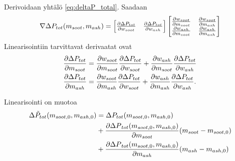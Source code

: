 





Derivoidaan yhtälö \eqref{eq:deltaP_total}. Saadaan
\begin{align}
    \nabla \Delta P_{tot}(m_{soot}, m_{ash})=
    \begin{bmatrix}   \frac{\partial \Delta P_{tot}}{\partial w_{soot}}
        &   \frac{\partial \Delta P_{tot}}{\partial w_{ash}}
         \end{bmatrix}
    \begin{bmatrix} 
        \frac{\partial w_{soot}}{\partial m_{soot}} & \frac{\partial w_{soot}}{\partial m_{ash}}
    \\  \frac{\partial w_{ash}}{\partial m_{soot}} & \frac{\partial w_{ash}}{\partial m_{ash}}
         \end{bmatrix}
\end{align}
Linearisointiin tarvittavat derivaatat ovat 
\begin{align}
    \frac{\partial \Delta P_{tot}}{\partial m_{soot}} &=
        \frac{\partial w_{soot}}{\partial m_{soot}}
        \frac{\partial \Delta P_{tot}}{\partial w_{soot}}
        +
        \frac{\partial w_{ash}}{\partial m_{soot}}
        \frac{\partial \Delta P_{tot}}{\partial w_{ash}}
    \\
    \frac{\partial \Delta P_{tot}}{\partial m_{ash}} &=
        \frac{\partial w_{soot}}{\partial m_{ash}}
        \frac{\partial \Delta P_{tot}}{\partial w_{soot}}
        +
        \frac{\partial w_{ash}}{\partial m_{ash}}
        \frac{\partial \Delta P_{tot}}{\partial w_{ash}}.
\end{align}

Linearisointi on muotoa
\begin{align}
    \begin{split}
    \Delta\tilde{ P}_{tot}(m_{soot, 0}, m_{ash, 0}) &= \Delta P_{tot}(m_{soot, 0}, m_{ash, 0})
    \\ &+
    \frac{\partial {\Delta P}_{tot}(m_{soot, 0}, m_{ash, 0})}{\partial m_{soot}} (m_{soot} - m_{soot,0}) 
    \\ &+ 
    \frac{\partial {\Delta P}_{tot}(m_{soot, 0}, m_{ash, 0})}{\partial m_{ash}}  (m_{ash} - m_{ash,0})
    \end{split}
\end{align}

